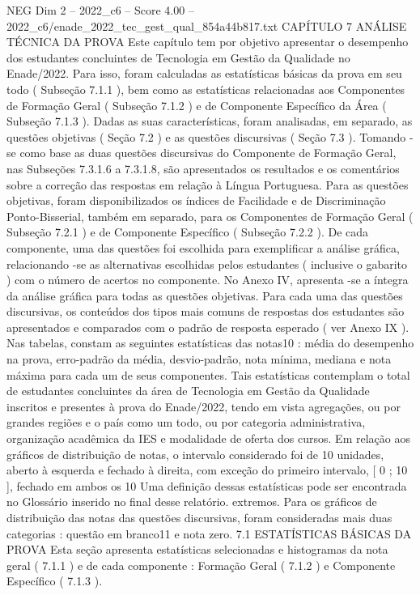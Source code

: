 \begin{textsample}{NEG Dim 2 – 2022\_c6 – Score 4.00 – 2022\_c6/enade\_2022\_tec\_gest\_qual\_854a44b817.txt}  \label{ex:f2_neg_296}
CAPÍTULO 7 ANÁLISE TÉCNICA DA PROVA Este capítulo tem por objetivo apresentar o desempenho dos estudantes concluintes de Tecnologia em Gestão da Qualidade no Enade/2022.
Para isso, foram calculadas as estatísticas básicas da prova em seu todo ( Subseção 7.1.1 ), bem como as estatísticas relacionadas aos Componentes de Formação Geral ( Subseção 7.1.2 ) e de Componente Específico da Área ( Subseção 7.1.3 ).
Dadas as suas características, foram analisadas, em separado, as questões objetivas ( Seção 7.2 ) e as questões discursivas ( Seção 7.3 ).
Tomando -se como base as duas questões discursivas do Componente de Formação Geral, nas Subseções 7.3.1.6 a 7.3.1.8, são apresentados os resultados e os comentários sobre a correção das respostas em relação à Língua Portuguesa.
Para as questões objetivas, foram disponibilizados os índices de Facilidade e de Discriminação Ponto-Bisserial, também em separado, para os Componentes de Formação Geral ( Subseção 7.2.1 ) e de Componente Específico ( Subseção 7.2.2 ).
De cada componente, uma das questões foi escolhida para exemplificar a análise gráfica, relacionando -se as alternativas escolhidas pelos estudantes ( inclusive o gabarito ) com o número de acertos no componente.
No Anexo IV, apresenta -se a íntegra da análise gráfica para todas as questões objetivas.
Para cada uma das questões discursivas, os conteúdos dos tipos mais comuns de respostas dos estudantes são apresentados e comparados com o padrão de resposta esperado ( ver Anexo IX ).
Nas tabelas, constam as seguintes estatísticas das notas10 : média do desempenho na prova, erro-padrão da média, desvio-padrão, nota mínima, mediana e nota máxima para cada um de seus componentes.
Tais estatísticas contemplam o total de estudantes concluintes da área de Tecnologia em Gestão da Qualidade inscritos e presentes à prova do Enade/2022, tendo em vista agregações, ou por grandes regiões e o país como um todo, ou por categoria administrativa, organização acadêmica da IES e modalidade de oferta dos cursos.
Em relação aos gráficos de distribuição de notas, o intervalo considerado foi de 10 unidades, aberto à esquerda e fechado à direita, com exceção do primeiro intervalo, [ 0 ; 10 ], fechado em ambos os 10 Uma definição dessas estatísticas pode ser encontrada no Glossário inserido no final desse relatório. extremos.
Para os gráficos de distribuição das notas das questões discursivas, foram consideradas mais duas categorias : questão em branco11 e nota zero. 7.1 ESTATÍSTICAS BÁSICAS DA PROVA Esta seção apresenta estatísticas selecionadas e histogramas da nota geral ( 7.1.1 ) e de cada componente : Formação Geral ( 7.1.2 ) e Componente Específico ( 7.1.3 ).

\end{textsample}
